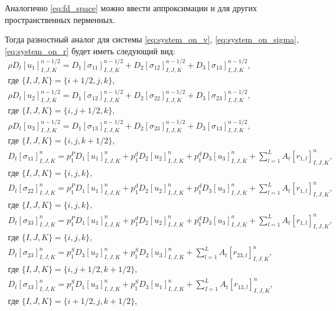 \documentclass[a4paper, fontsize=14pt]{article}
\begin{document}
Аналогично \eqref{eq:fd_space} можно ввести аппроксимации и для других пространственных перменных.

Тогда разностный аналог для системы \eqref{eq:system_on_v}, \eqref{eq:system_on_sigma}, \eqref{eq:system_on_r}  будет иметь следующий вид:
    \begin{gather*}
        \rho D_{t}[u_{1}]_{I,J,K}^{n-1/2} = D_{1}[\sigma_{11}]_{I,J,K}^{n-1/2}+D_{2}[\sigma_{12}]_{I,J,K}^{n-1/2}+D_{3}[\sigma_{13}]_{I,J,K}^{n-1/2},\\ \text{где } \{I,J,K\}=\{i+1/2,j,k\},\\ 
        \rho D_{t}[u_{2}]_{I,J,K}^{n-1/2} = D_{1}[\sigma_{12}]_{I,J,K}^{n-1/2}+D_{2}[\sigma_{22}]_{I,J,K}^{n-1/2}+D_{3}[\sigma_{23}]_{I,J,K}^{n-1/2},\\ \text{где } \{I,J,K\}=\{i,j+1/2,k\},\\ 
        \rho D_{t}[u_{3}]_{I,J,K}^{n-1/2} = D_{1}[\sigma_{13}]_{I,J,K}^{n-1/2}+D_{2}[\sigma_{23}]_{I,J,K}^{n-1/2}+D_{3}[\sigma_{13}]_{I,J,K}^{n-1/2},\\ \text{где } \{I,J,K\}=\{i,j,k+1/2\},\\ 
        D_{t}[\sigma_{11}]_{I,J,K}^{n} = p_{1}^{P}D_{1}[u_{1}]_{I,J,K}^{n}+p_{1}^{d}D_{2}[u_{2}]_{I,J,K}^{n}+p_{1}^{d}D_{3}[u_{3}]_{I,J,K}^{n}+\sum_{l=1}^{L}A_{t}[r_{1,l}]_{I,J,K}^{n}, \\ \text{где }\{I,J,K\}=\{i,j,k\},\\ 
        D_{t}[\sigma_{22}]_{I,J,K}^{n} = p_{1}^{P}D_{1}[u_{1}]_{I,J,K}^{n}+p_{1}^{d}D_{2}[u_{2}]_{I,J,K}^{n}+p_{1}^{d}D_{3}[u_{3}]_{I,J,K}^{n}+\sum_{l=1}^{L}A_{t}[r_{1,l}]_{I,J,K}^{n}, \\ \text{где }\{I,J,K\}=\{i,j,k\},\\ 
        D_{t}[\sigma_{33}]_{I,J,K}^{n} = p_{1}^{P}D_{1}[u_{1}]_{I,J,K}^{n}+p_{1}^{d}D_{2}[u_{2}]_{I,J,K}^{n}+p_{1}^{d}D_{3}[u_{3}]_{I,J,K}^{n}+\sum_{l=1}^{L}A_{t}[r_{1,l}]_{I,J,K}^{n}, \\ \text{где }\{I,J,K\}=\{i,j,k\},\\ 
        D_{t}[\sigma_{23}]_{I,J,K}^{n}=p_{1}^{S}D_{3}[u_{2}]_{I,J,K}^{n}+p_{1}^{S}D_{2}[u_{3}]_{I,J,K}^{n}+\sum_{l=1}^{L}A_{t}[r_{23,l}]_{I,J,K}^{n}, \\ \text{где } \{I,J,K\}=\{i,j+1/2,k+1/2\},\\ 
        D_{t}[\sigma_{13}]_{I,J,K}^{n}=p_{1}^{S}D_{1}[u_{3}]_{I,J,K}^{n}+p_{1}^{S}D_{3}[u_{1}]_{I,J,K}^{n}+\sum_{I=1}^{L}A_{t}[r_{13,l}]_{I,J,K}^{n}, \\ \text{где } \{I,J,K\}=\{i+1/2,j,k+1/2\},\\ 

\end{gather*}
\end{document}

